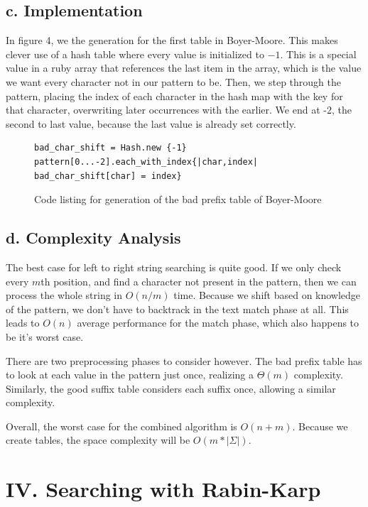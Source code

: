 \documentclass{chi2005}
\begin{document}
\subsection{c. Implementation}

In figure 4, we the generation for the first table in Boyer-Moore. This makes clever use of a hash table where every value is initialized to $-1$. This is a special value in a ruby array that references the last item in the array, which is the value we want every character not in our pattern to be. Then, we step through the pattern, placing the index of each character in the hash map with the key for that character, overwriting later occurrences with the earlier. We end at -2, the second to last value, because the last value is already set correctly.

\begin{figure}
\begin{lstlisting}
bad_char_shift = Hash.new {-1}
pattern[0...-2].each_with_index{|char,index| bad_char_shift[char] = index}
\end{lstlisting}
\caption{Code listing for generation of the  bad prefix table of Boyer-Moore}
\label{figure4}
\end{figure}

\subsection{d. Complexity Analysis }

The best case for left to right string searching is quite good. If we only check every $m$th position, and find a character not present in the pattern, then we can process the whole string in $O(n/m)$ time. Because we shift based on knowledge of the pattern, we don't have to backtrack in the text match phase at all. This leads to $O(n)$ average performance for the match phase, which also happens to be it's worst case.

There are two preprocessing phases to consider however. The bad prefix table has to look at each value in the pattern just once, realizing a $\Theta(m)$ complexity. Similarly, the good suffix table considers each suffix once, allowing a similar complexity.

Overall, the worst case for the combined algorithm is $O(n+m)$. Because we create tables, the space complexity will be $O(m*|\Sigma|)$.

\section{IV. Searching with Rabin-Karp}
\end{document}

